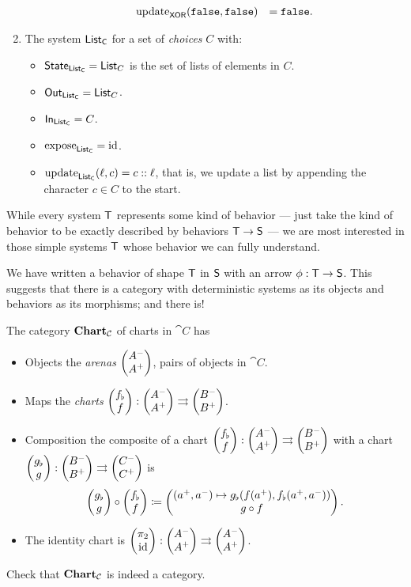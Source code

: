 \documentclass[DynamicalBook]{subfiles}
\begin{document}
\begin{exercise}
\begin{enumerate}
\begin{itemize}
\[\begin{aligned}
        &\mathrm{update}_{\mathsf{XOR}}(\mathtt{false}, \mathtt{false}) &= \mathtt{false}.
          \end{aligned}\]
    \end{itemize}
  \item The system $\mathsf{List_C}$ for a set of \emph{choices} $C$ with:
    \begin{itemize}
      \item $\mathsf{State}_{\mathsf{List_C}} = \mathsf{List}_C$ is the set of lists of elements in
        $C$.
      \item $\mathsf{Out}_{\mathsf{List_C}} = \mathsf{List}_C$.
      \item $\mathsf{In}_{\mathsf{List_C}} = C$.
      \item $\mathrm{expose}_{\mathsf{List_C}} = \mathrm{id}$.
      \item $\mathrm{update}_{\mathsf{List_C}}(\ell, c) = c::\ell$, that is, we update a list by
        appending the character $c \in C$ to the start.
    \end{itemize}
  \end{enumerate}
\end{exercise}

While every system $\mathsf{T}$ represents some kind of behavior --- just take the kind of
behavior to be exactly described by behaviors $\mathsf{T} \to \mathsf{S}$ --- we are
most interested in those simple systems $\mathsf{T}$ whose behavior we can fully
understand. 


We have written a behavior of shape $\mathsf{T}$ in $\mathsf{S}$ with an arrow $\phi :
\mathsf{T} \to \mathsf{S}$. This suggests that there is a category with deterministic
systems as its objects and behaviors as its morphisms; and there is!

\begin{definition}\label{def.category_of_charts}
  The category $\textbf{Chart}_{\mathcal{C}}$ of charts in $\cat{C}$ has
  \begin{itemize}
    \item Objects the \emph{arenas} $\begin{pmatrix}{A^-} \\ {A^+} \end{pmatrix}$, pairs of objects in $\cat{C}$.
    \item Maps the \emph{charts} $\begin{pmatrix}{f_{\flat}} \\ {f} \end{pmatrix} : \begin{pmatrix}{A^-} \\ {A^+} \end{pmatrix}
      \rightrightarrows \begin{pmatrix}{B^-} \\ {B^+} \end{pmatrix}$.
    \item Composition the composite of a chart $\begin{pmatrix}{f_{\flat}} \\ {f} \end{pmatrix} : \begin{pmatrix}{A^-} \\ {A^+} \end{pmatrix}
      \rightrightarrows \begin{pmatrix}{B^-} \\ {B^+} \end{pmatrix}$ with a chart $\begin{pmatrix}{g_{\flat}} \\ {g} \end{pmatrix} : \begin{pmatrix}{B^-} \\ {B^+} \end{pmatrix}
      \rightrightarrows \begin{pmatrix}{C^-} \\ {C^+} \end{pmatrix}$ is 
$$\begin{pmatrix}{g_{\flat}} \\ {g} \end{pmatrix} \circ \begin{pmatrix}{f_{\flat}} \\ {f} \end{pmatrix} \coloneqq \begin{pmatrix}{(a^+, a^-)
  \mapsto g_{\flat}(f(a^+), f_{\flat}(a^+, a^-))} \\ {g \circ f} \end{pmatrix}.$$
     \item The identity chart is $\begin{pmatrix}{\pi_2} \\ {\mathrm{id}} \end{pmatrix} : \begin{pmatrix}{A^-} \\ {A^+} \end{pmatrix}
       \rightrightarrows \begin{pmatrix}{A^-} \\ {A^+} \end{pmatrix}$.
  \end{itemize}
\end{definition}
\begin{exercise}
  Check that $\textbf{Chart}_{\mathcal{C}}$ is indeed a category.
\end{exercise}
\end{document}
